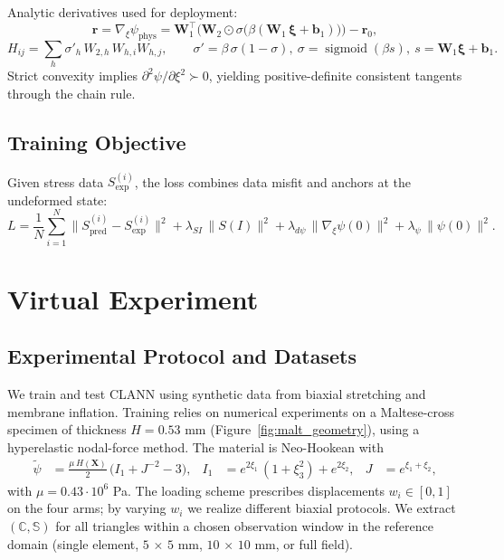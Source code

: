 \documentclass[journal,article,submit,pdftex,moreauthors]{Definitions/mdpi}
\newcommand{\vect}[1]{\boldsymbol{#1}}
\begin{document}
Analytic derivatives used for deployment:
\begin{equation}
  \vect r = \nabla_{\xi} \psi_{\mathrm{phys}} = \mathbf W_1^{\top} \Big( \mathbf W_2 \odot \sigma\big(\beta (\mathbf W_1 \, \boldsymbol{\xi} + \mathbf b_1)\big) \Big) - \vect r_0,
  \label{eq:energy_gradient_eng}
\end{equation}
\begin{equation}
  H_{ij} = \sum_h \sigma'_h \, W_{2,h} \, W_{h,i} W_{h,j},\qquad \sigma' = \beta\,\sigma(1-\sigma),\ \sigma=\operatorname{sigmoid}(\beta s),\ s=\mathbf W_1\boldsymbol{\xi}+\mathbf b_1.
  \label{eq:energy_hessian_eng}
\end{equation}
Strict convexity implies $\partial^2\psi/\partial\xi^2 \succ 0$, yielding positive-definite consistent tangents through the chain rule.

\subsection{Training Objective}
Given stress data \(S^{(i)}_{\text{exp}}\), the loss combines data misfit and anchors at the undeformed state:
\begin{equation}
L=\frac{1}{N}\sum_{i=1}^N\lVert S^{(i)}_{\text{pred}}-S^{(i)}_{\text{exp}}\rVert^2+\lambda_{SI}\,\lVert S(I)\rVert^2+\lambda_{d\psi}\,\lVert\nabla_{\xi}\psi(0)\rVert^2+\lambda_{\psi}\,\lVert\psi(0)\rVert^2.
\end{equation}

\section{Virtual Experiment}
\subsection{Experimental Protocol and Datasets}
We train and test CLANN using synthetic data from biaxial stretching and membrane inflation. Training relies on numerical experiments on a Maltese-cross specimen of thickness $H=0.53$ mm (Figure~\ref{fig:malt_geometry}), using a hyperelastic nodal-force method. The material is Neo-Hookean with
\begin{align}\label{eq:neohook_eng}
  \widetilde{\psi} &= \frac{\mu\,H(\vect X)}{2}\,\big(I_1 + J^{-2} -3\big), &
  I_1 &= e^{2\xi_1}\,(1+\xi_3^2) + e^{2\xi_2}, & J &= e^{\xi_1+\xi_2},
\end{align}
with $\mu=0.43\cdot 10^6$ Pa. The loading scheme prescribes displacements $w_i\in[0,1]$ on the four arms; by varying $w_i$ we realize different biaxial protocols. We extract $(\mathbb C,\mathbb S)$ for all triangles within a chosen observation window in the reference domain (single element, $5\,\times\,5$ mm, $10\,\times\,10$ mm, or full field).
\end{document}
